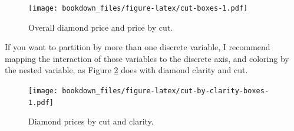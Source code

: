 \documentclass[12pt,]{isuthesis}
\newenvironment{Shaded}{\begin{snugshade}}{\end{snugshade}}
\newcommand{\KeywordTok}[1]{\textcolor[rgb]{0.13,0.29,0.53}{\textbf{{#1}}}}
\newcommand{\DataTypeTok}[1]{\textcolor[rgb]{0.13,0.29,0.53}{{#1}}}
\newcommand{\DecValTok}[1]{\textcolor[rgb]{0.00,0.00,0.81}{{#1}}}
\newcommand{\FloatTok}[1]{\textcolor[rgb]{0.00,0.00,0.81}{{#1}}}
\newcommand{\StringTok}[1]{\textcolor[rgb]{0.31,0.60,0.02}{{#1}}}
\newcommand{\OtherTok}[1]{\textcolor[rgb]{0.56,0.35,0.01}{{#1}}}
\newcommand{\NormalTok}[1]{{#1}}
\begin{document}
\begin{Shaded}
\end{Shaded}

\begin{figure}[htbp]
\centering
\texttt{[image: bookdown\_files/figure-latex/cut-boxes-1.pdf]}
\caption{\label{fig:cut-boxes}Overall diamond price and price by cut.}
\end{figure}

If you want to partition by more than one discrete variable, I recommend
mapping the interaction of those variables to the discrete axis, and
coloring by the nested variable, as Figure
\ref{fig:cut-by-clarity-boxes} does with diamond clarity and cut.

\begin{Shaded}
\end{Shaded}

\begin{figure}[htbp]
\centering
\texttt{[image: bookdown\_files/figure-latex/cut-by-clarity-boxes-1.pdf]}
\caption{\label{fig:cut-by-clarity-boxes}Diamond prices by cut and clarity.}
\end{figure}
\end{document}

